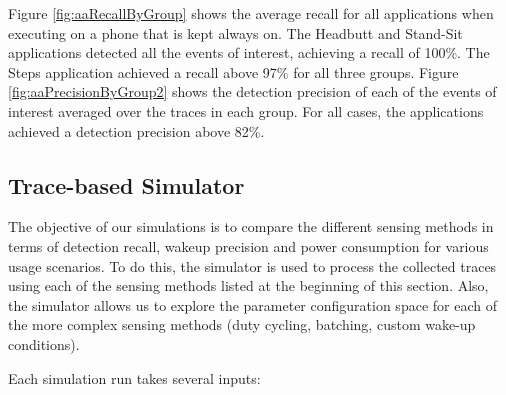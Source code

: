 Figure \ref{fig:aaRecallByGroup} shows the average recall for all applications when executing on a phone that is kept always on.  The 
Headbutt and Stand-Sit applications detected all the events of interest, achieving a recall of 100\%. The Steps application achieved a 
recall above 97\% for all three groups. Figure \ref{fig:aaPrecisionByGroup2} shows the detection precision of each of the events of 
interest averaged over the traces in each group. For all cases, the applications achieved a detection precision above 82\%.




\subsection{Trace-based Simulator}

The objective of our simulations is to compare the different sensing methods in terms of detection recall, wakeup precision and power consumption for various usage scenarios. To do this, the simulator is used to process the collected traces using each of the sensing methods listed at the beginning of this section. Also, the simulator allows us to explore the parameter configuration space for each of the more complex sensing methods (duty cycling, batching, custom wake-up conditions).

Each simulation run takes several inputs:

